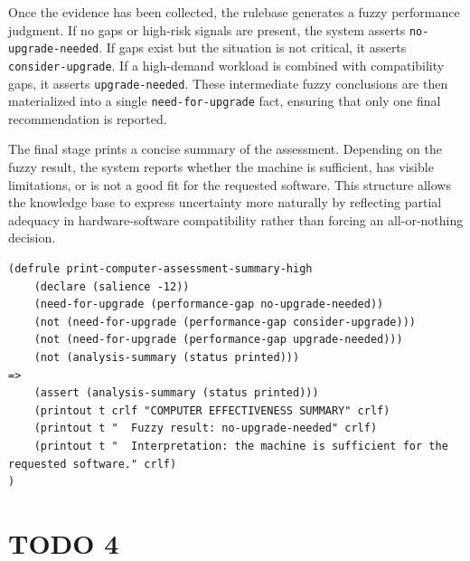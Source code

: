 \documentclass{article}
\begin{document}
Once the evidence has been collected, the rulebase generates a fuzzy performance judgment. If no gaps or high-risk signals are present, the system asserts \texttt{no-upgrade-needed}. If gaps exist but the situation is not critical, it asserts \texttt{consider-upgrade}. If a high-demand workload is combined with compatibility gaps, it asserts \texttt{upgrade-needed}. These intermediate fuzzy conclusions are then materialized into a single \texttt{need-for-upgrade} fact, ensuring that only one final recommendation is reported.

The final stage prints a concise summary of the assessment. Depending on the fuzzy result, the system reports whether the machine is sufficient, has visible limitations, or is not a good fit for the requested software. This structure allows the knowledge base to express uncertainty more naturally by reflecting partial adequacy in hardware-software compatibility rather than forcing an all-or-nothing decision.

\begin{file}
    \begin{lstlisting}
(defrule print-computer-assessment-summary-high
    (declare (salience -12))
    (need-for-upgrade (performance-gap no-upgrade-needed))
    (not (need-for-upgrade (performance-gap consider-upgrade)))
    (not (need-for-upgrade (performance-gap upgrade-needed)))
    (not (analysis-summary (status printed)))
=>
    (assert (analysis-summary (status printed)))
    (printout t crlf "COMPUTER EFFECTIVENESS SUMMARY" crlf)
    (printout t "  Fuzzy result: no-upgrade-needed" crlf)
    (printout t "  Interpretation: the machine is sufficient for the requested software." crlf)
)
\end{lstlisting}
\end{file}


\section*{TODO 4}

\end{document}
